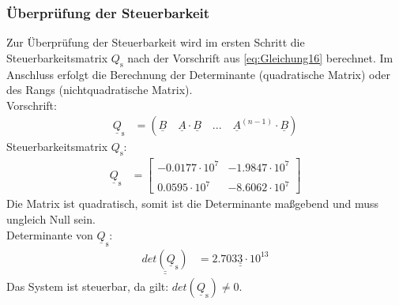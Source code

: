 \subsubsection{Überprüfung der Steuerbarkeit}
\label{sec:Ueberpruefung_der_Steuerbarkeit}
Zur Überprüfung der Steuerbarkeit wird im ersten Schritt die Steuerbarkeitsmatrix $Q_{\mathrm{s}}$ nach der Vorschrift aus \autoref{eq:Gleichung16} berechnet. Im Anschluss erfolgt die Berechnung der Determinante (quadratische Matrix) oder des Rangs (nichtquadratische Matrix).\\
\newline
Vorschrift:
\begin{align}
    \underline{Q}_{\mathrm{s}} &= \left(\underline{B} \quad \underline{A}\cdot\underline{B} \quad ... \quad \underline{A}^{(n-1)}\cdot\underline{B}\right)
    \label{eq:Gleichung16}
\end{align}
Steuerbarkeitsmatrix $Q_{\mathrm{s}}$:
\begin{align}
    \underline{Q}_{\mathrm{s}} &=
    \begin{bmatrix}
        -0.0177\cdot 10^7 & -1.9847\cdot 10^7 \\\\
        0.0595\cdot 10^7 & -8.6062\cdot 10^7
    \end{bmatrix}
    \label{eq:Gleichung17}
\end{align}
\newline
Die Matrix ist quadratisch, somit ist die Determinante maßgebend und muss ungleich Null sein.\\
\newline
Determinante von $\underline{Q}_{\mathrm{s}}$:
\begin{align*}
    \underline{\underline{det(\underline{Q}_{\mathrm{s}})}} &= \underline{\underline{ 2.7033\cdot 10^{13}}}
\end{align*}
\newline
Das System ist steuerbar, da gilt: $det(\underline{Q}_{\mathrm{s}}) \neq 0$.
